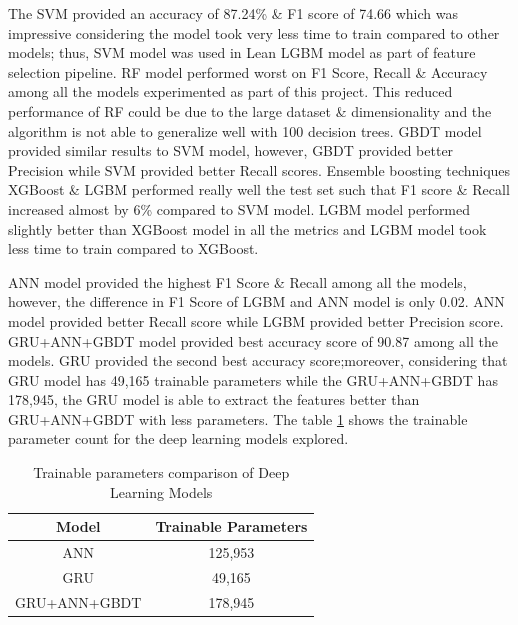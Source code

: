 \documentclass[twoside,11pt,a4paper]{article}
\begin{document}
The \acs{SVM} provided an accuracy of 87.24\% \& F1 score of 74.66 which was impressive considering the model took very less time to train compared to other models; thus, \acs{SVM} model was used in Lean \acs{LGBM} model as part of feature selection pipeline. \acs{RF} model performed worst on F1 Score, Recall \& Accuracy among all the models experimented as part of this project. This reduced performance of \acs{RF} could be due to the large dataset \& dimensionality and the algorithm is not able to generalize well with 100 decision trees. \acs{GBDT} model provided similar results to \acs{SVM} model, however, \acs{GBDT} provided better Precision while \acs{SVM} provided better Recall scores. Ensemble boosting techniques \acs{XGBoost} \& \acs{LGBM} performed really well the test set such that F1 score \& Recall increased almost by  6\% compared to \acs{SVM} model. \acs{LGBM} model performed slightly better than \acs{XGBoost} model in all the metrics and \acs{LGBM} model took less time to train compared to \acs{XGBoost}.

\acs{ANN} model provided the highest F1 Score \& Recall among all the models, however, the difference in F1 Score of \acs{LGBM} and \acs{ANN} model is only 0.02. \acs{ANN}  model provided better Recall score while \acs{LGBM} provided better Precision score. \acs{GRU}+\acs{ANN}+\acs{GBDT} model provided best accuracy score of 90.87 among all the models. \acs{GRU} provided the second best accuracy score;moreover, considering that \acs{GRU} model has 49,165 trainable parameters while the \acs{GRU}+\acs{ANN}+\acs{GBDT} has 178,945, the \acs{GRU} model is able to extract the features better than \acs{GRU}+\acs{ANN}+\acs{GBDT} with less parameters. The table \ref{table:trainable_params} shows the trainable parameter count for the deep learning models explored.

\begin{table}[h]
	\begin{center}
		\begin{tabular}{|| c | c ||} 
			\hline
			Model & Trainable Parameters \\ [0.5ex] 
			\hline\hline
			ANN	& 125,953 \\
			\hline
			GRU	& 49,165 \\
			\hline
			GRU+ANN+GBDT	& 178,945 \\
			\hline
		\end{tabular}
		\caption{Trainable parameters comparison of Deep Learning Models}
		\label{table:trainable_params}
	\end{center}
\end{table}
\end{document}
